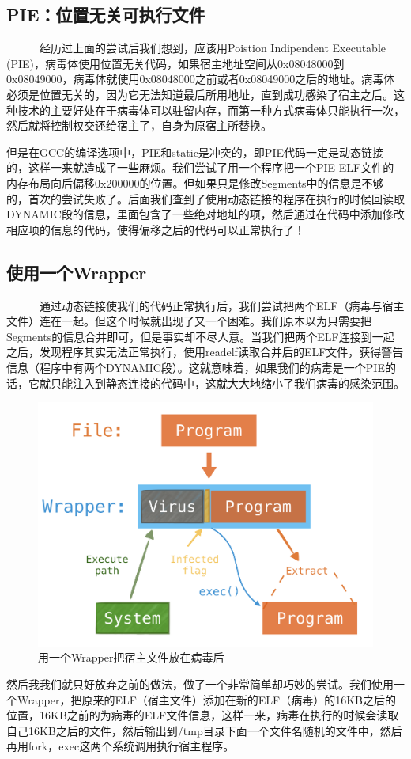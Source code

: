 \documentclass[a4paper, 11pt]{article}
\begin{document}
\subsection{PIE：位置无关可执行文件}
~~~~~~经历过上面的尝试后我们想到，应该用Poistion Indipendent Executable (PIE)，病毒体使用位置无关代码，如果宿主地址空间从0x08048000到0x08049000，病毒体就使用0x08048000之前或者0x08049000之后的地址。病毒体必须是位置无关的，因为它无法知道最后所用地址，直到成功感染了宿主之后。这种技术的主要好处在于病毒体可以驻留内存，而第一种方式病毒体只能执行一次，然后就将控制权交还给宿主了，自身为原宿主所替换。

但是在GCC的编译选项中，PIE和static是冲突的，即PIE代码一定是动态链接的，这样一来就造成了一些麻烦。我们尝试了用一个程序把一个PIE-ELF文件的内存布局向后偏移0x200000的位置。但如果只是修改Segments中的信息是不够的，首次的尝试失败了。后面我们查到了使用动态链接的程序在执行的时候回读取DYNAMIC段的信息，里面包含了一些绝对地址的项，然后通过在代码中添加修改相应项的信息的代码，使得偏移之后的代码可以正常执行了！

\subsection{使用一个Wrapper}
~~~~~~通过动态链接使我们的代码正常执行后，我们尝试把两个ELF（病毒与宿主文件）连在一起。但这个时候就出现了又一个困难。我们原本以为只需要把Segments的信息合并即可，但是事实却不尽人意。当我们把两个ELF连接到一起之后，发现程序其实无法正常执行，使用readelf读取合并后的ELF文件，获得警告信息（程序中有两个DYNAMIC段）。这就意味着，如果我们的病毒是一个PIE的话，它就只能注入到静态连接的代码中，这就大大地缩小了我们病毒的感染范围。
	\begin{figure}[htbp]
		\centering
		\includegraphics[width = \textwidth]{figures/fig2_wrapper}
		\caption{用一个Wrapper把宿主文件放在病毒后}
		\label{fig:way3}
	\end{figure}
然后我我们就只好放弃之前的做法，做了一个非常简单却巧妙的尝试。我们使用一个Wrapper，把原来的ELF（宿主文件）添加在新的ELF（病毒）的16KB之后的位置，16KB之前的为病毒的ELF文件信息，这样一来，病毒在执行的时候会读取自己16KB之后的文件，然后输出到/tmp目录下面一个文件名随机的文件中，然后再用fork，exec这两个系统调用执行宿主程序。
\end{document}
